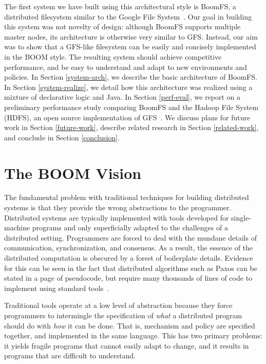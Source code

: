 \documentclass{article}
\begin{document}
The first system we have built using this architectural style is
BoomFS, a distributed filesystem similar to the Google File
System~\cite{gfs}. Our goal in building this system was not novelty of
design: although BoomFS supports multiple master nodes, its
architecture is otherwise very similar to GFS. Instead, our aim was to
show that a GFS-like filesystem can be easily and concisely
implemented in the BOOM style. The resulting system should achieve
competitive performance, and be easy to understand and adapt to new
environments and policies. In Section \ref{system-arch}, we describe
the basic architecture of BoomFS. In Section \ref{system-realize}, we
detail how this architecture was realized using a mixture of
declarative logic and Java. In Section \ref{perf-eval}, we report on a
preliminary performance study comparing BoomFS and the Hadoop File
System (HDFS), an open source implementation of
GFS~\cite{hdfs-arch}. We discuss plans for future work in Section
\ref{future-work}, describe related research in Section
\ref{related-work}, and conclude in Section \ref{conclusion}.

\section{The BOOM Vision}
\label{boom-vision}
The fundamental problem with traditional techniques for building
distributed systems is that they provide the wrong abstractions to the
programmer. Distributed systems are typically implemented with tools
developed for single-machine programs and only superficially adapted
to the challenges of a distributed setting. Programmers are forced to
deal with the mundane details of communication, synchronization, and
consensus. As a result, the essence of the distributed computation is
obscured by a forest of boilerplate details. Evidence for this can be
seen in the fact that distributed algorithms such as Paxos can be
stated in a page of pseudocode, but require many thousands of lines of
code to implement using standard tools~\cite{paxos-made-live}.

Traditional tools operate at a low level of abstraction because they
force programmers to intermingle the specification of \emph{what} a
distributed program should do with \emph{how} it can be done. That is,
mechanism and policy are specified together, and implemented in the
same language. This has two primary problems: it yields fragile
programs that cannot easily adapt to change, and it results in
programs that are difficult to understand.
\end{document}
